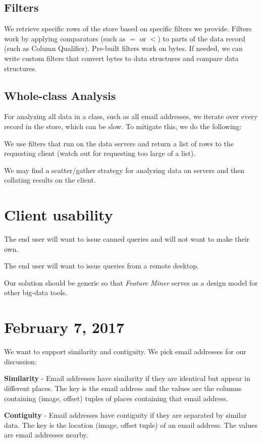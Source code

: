 \documentclass[12pt,twoside]{article}
\newcommand{\fm}{\emph{Feature Miner}\xspace}
\begin{document}
\subsection{Filters}
We retrieve specific rows of the store based on specific filters we provide. Filters work by applying comparators (such as $=$ or $<$) to parts of the data record (such as Column Qualifier).  Pre-built filters work on bytes. If needed, we can write custom filters that convert bytes to data structures and compare data structures.

\subsection{Whole-class Analysis}
For analyzing all data in a class, such as all email addresses, we iterate over every record in the store, which can be slow. To mitigate this, we do the following:

\begin{compactitem}
\item We use filters that run on the data servers and return a list of rows to the requesting client (watch out for requesting too large of a list).
\item We may find a scatter/gather strategy for analyzing data on servers and then collating results on the client.
\end{compactitem}

\section{Client usability}
\begin{compactitem}
\item The end user will want to issue canned queries and will not want to make their own.
\item The end user will want to issue queries from a remote desktop.
\item Our solution should be generic so that \fm serves as a design model for other big-data tools.
\end{compactitem}

\section{February 7, 2017}
We want to support similarity and contiguity.  We pick email addresses for our discussion:

\begin{compactitem}
\item \textbf{Similarity} - Email addresses have similarity if they are identical but appear in different places. The key is the email address and the values are the columns containing (image, offset) tuples of places containing that email address.
\item \textbf{Contiguity} - Email addresses have contiguity if they are separated by similar data.  The key is the location (image, offset tuple) of an email address.  The values are email addresses nearby.
\end{compactitem}
\end{document}

